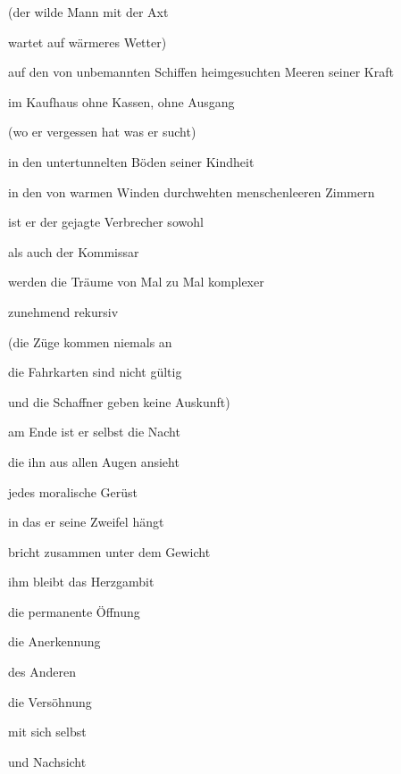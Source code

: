 \bigskip

(der wilde Mann mit der Axt

wartet auf wärmeres Wetter)


\bigskip

auf den von unbemannten Schiffen heimgesuchten Meeren seiner Kraft


\bigskip

im Kaufhaus ohne Kassen, ohne Ausgang


\bigskip

(wo er vergessen hat was er sucht)


\bigskip

in den untertunnelten Böden seiner Kindheit


\bigskip

in den von warmen Winden durchwehten menschenleeren Zimmern 


\bigskip

ist er der gejagte Verbrecher sowohl

als auch der Kommissar


\bigskip

werden die Träume von Mal zu Mal komplexer

zunehmend rekursiv


\bigskip

(die Züge kommen niemals an

die Fahrkarten sind nicht gültig

und die Schaffner geben keine Auskunft)


\bigskip


\bigskip


\bigskip

am Ende ist er selbst die Nacht

die ihn aus allen Augen ansieht


\bigskip

jedes moralische Gerüst

in das er seine Zweifel hängt

bricht zusammen unter dem Gewicht


\bigskip

ihm bleibt das Herzgambit

die permanente Öffnung

die Anerkennung

des Anderen

die Versöhnung

mit sich selbst

und Nachsicht


\bigskip


